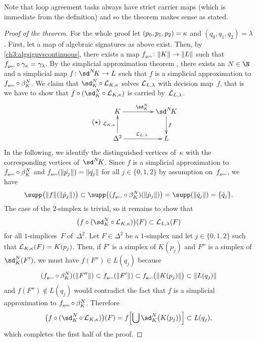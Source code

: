 Note that loop agreement tasks always have strict carrier maps (which
is immediate from the definition) and so the theorem makes sense as stated.

\begin{proof}[Proof of the theorem]
    \newcommand{\sdNkappa}{\sd^N\!\kappa}
    For the whole proof let $(p_0,p_1,p_2) = \kappa$ and $(q_0,q_1,q_2) = \lambda$.
    First, let a map of algebraic signatures as above exist. Then,
    by \cref{ch3:algsignvscontinuous}, there exists a map
    $f_{\scriptscriptstyle\mathrm{geo}}\colon\lVert K\rVert\to\lVert L\rVert$ such that
    $f_\geo\after\gamma_\kappa = \gamma_\lambda$. By the simplicial
    approximation theorem , there exists an $N\in\N$ and a
    simplicial map $f\colon\sdNK \to L$ such that $f$ is a simplicial
    approximation to $f_\geo\after\beta_K^N$.
    We claim that $\sd_K^N\after\Loop{K,\kappa}$
    solves $\mathcal{L}_{L,\lambda}$ with decision map~$f$,
    that is we have to show that $f\after(\sd_K^N\after\Loop{K,\kappa})$
    is carried by~$\mathcal{L}_{L,\lambda}$.
    \[ \tag{$\star$} \label{ch3:classification:proof:star}
        \begin{gathered}
            \xymatrix@C=1.5cm{
                K \ar[r]^{\sd_K^N} & \sdNK \ar[d]^-f
                \\
                \Delta^2 \ar[u]^-{\Loop{K,\kappa}} \ar[r]^{\Loop{L,\lambda}} & L
            }
        \end{gathered}
    \]
    In the following, we identify the distinguished vertices of~$\kappa$ with
    the corresponding vertices of~$\sdNK$. Since $f$ is a simplicial
    approximation to $f_\geo\after\beta_K^N$ and $f_{\scriptscriptstyle\mathrm{geo}}(\lVert\dot{p_j}\rVert) =
    \lVert\dot{q_j}\rVert$ for all $j\in\{0,1,2\}$ by assumption on~$f_{\scriptscriptstyle\mathrm{geo}}$, we have
    \[ \supp\bigl(\geom{f}(\geom{\dot{p}_j})\bigr)
        \subset \supp\bigl( (f_\geo\after\beta_K^N)(\geom{\dot{p}_j}) \bigr)
        = \supp(\geom{\dot{q}_j}) = \{\dot{q}_j\}
    . \]
    The case of the $2$-simplex is trivial, so it remains to show
    that
    \[ \bigl(f\after(\sd_K^N\after\Loop{K,\kappa})\bigr)(F)
        \subset \Loop{L,\lambda}(F)
    \]
    for all $1$-simplices~$F$ of~$\Delta^2$. Let $F\in\Delta^2$ be a $1$-simplex
    and let $j\in\{0,1,2\}$ such that $\mathcal{L}_{K,\kappa}(F) = K(p_j)$. Then, if
    $F'$ is a simplex of $K(p_j)$ and $F''$ is a simplex of $\sd_K^N(F')$, we must have
    $f(F'')\in L(q_j)$ because
    \[ (f_\geo\after\beta_K^N)(\geom{F''}) \subset f_\geo(\geom{F'})
        \subset f_\geo\bigl(\geom{K(p_j)}\bigr) \subset \geom{L(q_j)}
    \]
    and $f(F'')\notin L(q_j)$ would contradict the fact that $f$ is
    a simplicial approximation to $f_\geo\after\beta_K^N$. Therefore
    \[ \bigl(f\after(\sd_K^N\after\Loop{K,\kappa})\bigr)(F)
        = f\Bigl[ \bigcup \sd_K^N\bigl(K(p_j)\bigr) \Bigr]
        \subset L(q_j)
    , \]
    which completes the first half of the proof.
    

\end{proof}
